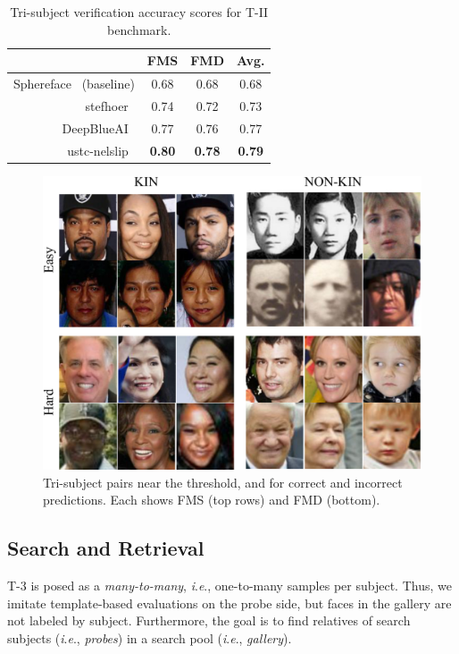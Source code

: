 \documentclass[letterpaper, 10 pt, conference]{ieeeconf}
\newcommand{\ie}{\textit{i}.\textit{e}., }
\begin{document}
\begin{table}[b]
\scriptsize
\centering
\caption {Tri-subject verification accuracy scores for T-II benchmark.}%
\label{tab:benchmark:track2}
\begin{tabular}{r|cc|c}
  &FMS & FMD & Avg. \\
  \midrule
  
  Sphereface~\cite{Liu_2017_CVPR} (baseline) & 0.68 & 0.68 & 0.68 \\ 
    stefhoer~\cite{id2} & 0.74 & 0.72 & 0.73 \\
  DeepBlueAI~\cite{id3}  & 0.77 & 0.76 & 0.77 \\
 ustc-nelslip~\cite{id6}  & \textbf{0.80} & \textbf{0.78} & \textbf{0.79} \\
\end{tabular}
\end{table}


\begin{figure}[t!]
    \centering
    \includegraphics[width = .9\linewidth]{figures/tri-montage-crop.pdf}
    \caption{Tri-subject pairs near the threshold, and for correct and incorrect predictions. Each shows FMS (top rows) and FMD (bottom).}
    \label{fig:track2:montage}
\end{figure}



\subsection{Search and Retrieval}\label{sec:search}
T-3 is posed as a \textit{many-to-many}, \ie one-to-many samples per subject. Thus, we imitate template-based evaluations on the probe side, but faces in the gallery are not labeled by subject. Furthermore, the goal is to find relatives of search subjects (\ie \textit{probes}) in a search pool (\ie \textit{gallery}).
\end{document}
